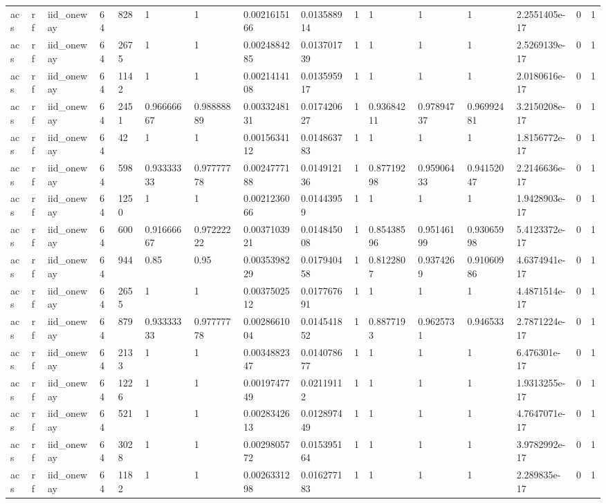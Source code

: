 \begin{tabular}{llllllllllllllll}
acs & rf & iid\_oneway & 64 & 828 & 1 & 1 & 0.0021615166 & 0.013588914 & 1 & 1 & 1 & 1 & 2.2551405e-17 & 0 & 1 \\
acs & rf & iid\_oneway & 64 & 2675 & 1 & 1 & 0.0024884285 & 0.013701739 & 1 & 1 & 1 & 1 & 2.5269139e-17 & 0 & 1 \\
acs & rf & iid\_oneway & 64 & 1142 & 1 & 1 & 0.0021414108 & 0.013595917 & 1 & 1 & 1 & 1 & 2.0180616e-17 & 0 & 1 \\
acs & rf & iid\_oneway & 64 & 2451 & 0.96666667 & 0.98888889 & 0.0033248131 & 0.017420627 & 1 & 0.93684211 & 0.97894737 & 0.96992481 & 3.2150208e-17 & 0 & 1 \\
acs & rf & iid\_oneway & 64 & 42 & 1 & 1 & 0.0015634112 & 0.014863783 & 1 & 1 & 1 & 1 & 1.8156772e-17 & 0 & 1 \\
acs & rf & iid\_oneway & 64 & 598 & 0.93333333 & 0.97777778 & 0.0024777188 & 0.014912136 & 1 & 0.87719298 & 0.95906433 & 0.94152047 & 2.2146636e-17 & 0 & 1 \\
acs & rf & iid\_oneway & 64 & 1250 & 1 & 1 & 0.0021236066 & 0.01443959 & 1 & 1 & 1 & 1 & 1.9428903e-17 & 0 & 1 \\
acs & rf & iid\_oneway & 64 & 600 & 0.91666667 & 0.97222222 & 0.0037103921 & 0.014845008 & 1 & 0.85438596 & 0.95146199 & 0.93065998 & 5.4123372e-17 & 0 & 1 \\
acs & rf & iid\_oneway & 64 & 944 & 0.85 & 0.95 & 0.0035398229 & 0.017940458 & 1 & 0.8122807 & 0.9374269 & 0.91060986 & 4.6374941e-17 & 0 & 1 \\
acs & rf & iid\_oneway & 64 & 2655 & 1 & 1 & 0.0037502512 & 0.017767691 & 1 & 1 & 1 & 1 & 4.4871514e-17 & 0 & 1 \\
acs & rf & iid\_oneway & 64 & 879 & 0.93333333 & 0.97777778 & 0.0028661004 & 0.014541852 & 1 & 0.8877193 & 0.9625731 & 0.946533 & 2.7871224e-17 & 0 & 1 \\
acs & rf & iid\_oneway & 64 & 2133 & 1 & 1 & 0.0034882347 & 0.014078677 & 1 & 1 & 1 & 1 & 6.476301e-17 & 0 & 1 \\
acs & rf & iid\_oneway & 64 & 1226 & 1 & 1 & 0.0019747749 & 0.02119112 & 1 & 1 & 1 & 1 & 1.9313255e-17 & 0 & 1 \\
acs & rf & iid\_oneway & 64 & 521 & 1 & 1 & 0.0028342613 & 0.012897449 & 1 & 1 & 1 & 1 & 4.7647071e-17 & 0 & 1 \\
acs & rf & iid\_oneway & 64 & 3028 & 1 & 1 & 0.0029805772 & 0.015395164 & 1 & 1 & 1 & 1 & 3.9782992e-17 & 0 & 1 \\
acs & rf & iid\_oneway & 64 & 1182 & 1 & 1 & 0.0026331298 & 0.016277183 & 1 & 1 & 1 & 1 & 2.289835e-17 & 0 & 1 \\

\end{tabular}
